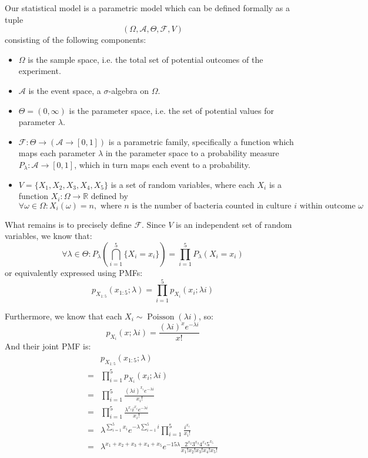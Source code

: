 \documentclass{article}
\begin{document}
\begin{ssolution}
Our statistical model is a parametric model which can be defined formally as a tuple
\[(\Omega, \mathcal{A}, \Theta, \mathcal{F},V)\]
consisting of the following components:

\begin{itemize}
	\item \(\Omega\) is the sample space, i.e. the total set of potential outcomes of the experiment.
	\item \(\mathcal{A}\) is the event space, a \(\sigma\)-algebra on \(\Omega\).
	\item \(\Theta = (0,\infty)\) is the parameter space, i.e. the set of potential values for parameter \(\lambda\).
	\item \(\mathcal{F} : \Theta \to (\mathcal{A}\to [0,1])\) is a parametric
family, specifically a function which maps each parameter
\(\lambda\) in the parameter space to a probability measure
\(P_\lambda: \mathcal{A} \to [0,1]\), which in turn maps each event to a
probability.
	\item\(V=\{X_1, X_2, X_3, X_4, X_5\}\) is a set of random variables, where each
\(X_i\) is a function \(X_i : \Omega \to \mathbb{R}\) defined by
\[\forall \omega\in \Omega : X_i(\omega) = n,\text{ where }n\text{ is the number of bacteria counted in culture }i\text{ within outcome }\omega \]
\end{itemize}

What remains is to precisely define \(\mathcal{F}\).
Since \(V\) is an independent set of random variables, we know that:
\[\forall \lambda\in \Theta: P_\lambda\left(\bigcap_{i=1}^5\{X_i=x_i\}\right) = \prod_{i=1}^5 P_\lambda(X_i=x_i)\]
or equivalently expressed using PMFs:
\[p_{X_{1:5}}(x_{1:5};\lambda) = \prod_{i=1}^5 p_{X_i}(x_i;\lambda i)\]

Furthermore, we know that each \(X_i \sim \operatorname{Poisson}(\lambda i)\), so:
\[p_{X_i}(x;\lambda i) = \frac{(\lambda i)^x e^{-\lambda i}}{x!}\]
And their joint PMF is:
\begin{align*}
	& p_{X_{1:5}}(x_{1:5};\lambda) \\
	=& \prod_{i=1}^5 p_{X_i}(x_i;\lambda i) \\
	=& \prod_{i=1}^5\frac{(\lambda i)^{x_i}e^{-\lambda i}}{x_i !} \\
	=& \prod_{i=1}^5\frac{\lambda^{x_i} i^{x_i}e^{-\lambda i}}{x_i !} \\
	=& \lambda^{\sum_{i=1}^5 x_i} e^{-\lambda \sum_{i=1}^5 i}\prod_{i=1}^5\frac{i^{x_i}}{x_i !} \\
	=& \lambda^{x_1+x_2+x_3+x_4+x_5} e^{-15\lambda}\frac{2^{x_2}3^{x_3}4^{x_4}5^{x_5}}{x_1! x_2! x_3! x_4! x_5!} \\
\end{align*}

\end{ssolution}
\end{document}
